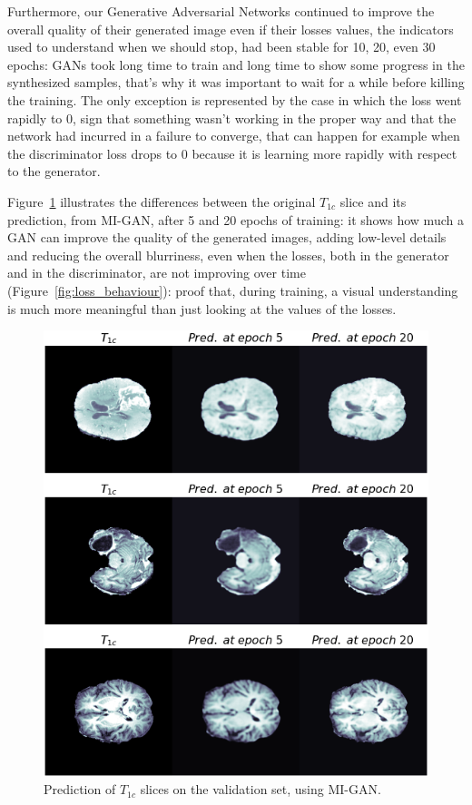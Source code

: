 Furthermore, our Generative Adversarial Networks continued to improve the overall quality of their generated image even if their losses values, the indicators used to understand when we should stop, had been stable for 10, 20, even 30 epochs: \ac{GAN}s took long time to train and long time to show some progress in the synthesized samples, that's why it was important to wait for a while before killing the training. The only exception is represented by the case in which the loss went rapidly to 0, sign that something wasn't working in the proper way and that the network had incurred in a failure to converge, that can happen for example when the discriminator loss drops to 0 because it is learning more rapidly with respect to the generator.

\vspace{5mm}
Figure~\ref{fig:epochs_behaviour} illustrates the differences between the original $T_{1c}$ slice and its prediction, from MI-GAN, after 5 and 20 epochs of training: it shows how much a \ac{GAN} can improve the quality of the generated images, adding low-level details and reducing the overall blurriness, even when the losses, both in the generator and in the discriminator, are not improving over time (Figure~\ref{fig:loss_behaviour}): proof that, during training, a visual understanding is much more meaningful than just looking at the values of the losses.


\begin{figure}[H]
\centering
\includegraphics[height=0.56\textheight]{images/t1c_through_epochs.pdf}
\caption[$T_{1c}$ predictions from MI-GAN]{Prediction of $T_{1c}$ slices on the validation set, using MI-GAN.}
\label{fig:epochs_behaviour}
\end{figure}
\newpage
